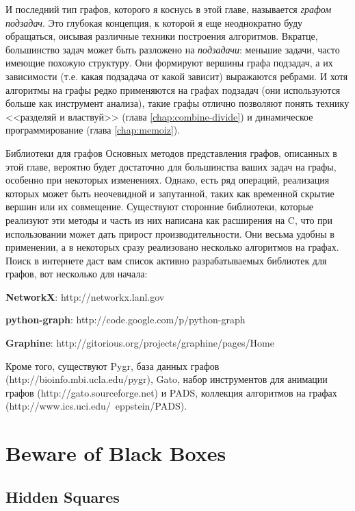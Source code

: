 И последний тип графов, которого я коснусь в этой главе, называется \textit{графом подзадач}. Это глубокая концепция, к которой я еще неоднократно буду обращаться, оисывая различные техники построения алгоритмов. Вкратце, большинство задач может быть разложено на \textit{подзадачи}: меньшие задачи, часто имеющие похожую структуру. Они формируют вершины графа подзадач, а их зависимости (т.е. какая подзадача от какой зависит) выражаются ребрами. И хотя алгоритмы на графы редко применяются на графах подзадач (они используются больше как инструмент анализа), такие графы отлично позволяют понять технику <<разделяй и властвуй>> (глава \ref{chap:combine-divide}) и динамическое программирование (глава \ref{chap:memoiz}).

\begin{notice}{Библиотеки для графов}
Основных методов представления графов, описанных в этой главе, вероятно будет достаточно для большинства ваших задач на графы, особенно при некоторых изменениях. Однако, есть ряд операций, реализация которых может быть неочевидной и запутанной, таких как временной скрытие вершин или их совмещение. Существуют сторонние библиотеки, которые реализуют эти методы и часть из них написана как расширения на C, что при использовании может дать прирост производительности. Они весьма удобны в применении, а в некоторых сразу реализовано несколько алгоритмов на графах. Поиск в интернете даст вам список активно разрабатываемых библиотек для графов, вот несколько для начала:
\begin{itemize*}
\item {\bf NetworkX}: http://networkx.lanl.gov
\item {\bf python-graph}: http://code.google.com/p/python-graph
\item {\bf Graphine}: http://gitorious.org/projects/graphine/pages/Home
\end{itemize*}

Кроме того, существуют Pygr, база данных графов (http://bioinfo.mbi.ucla.edu/pygr), Gato, набор инструментов для анимации графов (http://gato.sourceforge.net) и PADS, коллекция алгоритмов на графах (http://www.ics.uci.edu/~eppstein/PADS).
\end{notice}


\section{Beware of Black Boxes}
\subsection{Hidden Squares}
